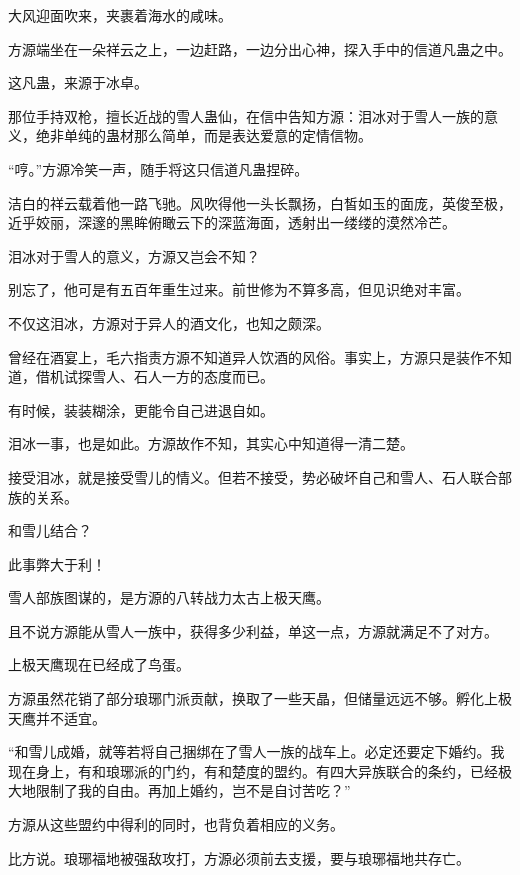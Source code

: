 
\begin{this_body}



大风迎面吹来，夹裹着海水的咸味。

方源端坐在一朵祥云之上，一边赶路，一边分出心神，探入手中的信道凡蛊之中。

这凡蛊，来源于冰卓。

那位手持双枪，擅长近战的雪人蛊仙，在信中告知方源：泪冰对于雪人一族的意义，绝非单纯的蛊材那么简单，而是表达爱意的定情信物。

“哼。”方源冷笑一声，随手将这只信道凡蛊捏碎。

洁白的祥云载着他一路飞驰。风吹得他一头长飘扬，白皙如玉的面庞，英俊至极，近乎姣丽，深邃的黑眸俯瞰云下的深蓝海面，透射出一缕缕的漠然冷芒。

泪冰对于雪人的意义，方源又岂会不知？

别忘了，他可是有五百年重生过来。前世修为不算多高，但见识绝对丰富。

不仅这泪冰，方源对于异人的酒文化，也知之颇深。

曾经在酒宴上，毛六指责方源不知道异人饮酒的风俗。事实上，方源只是装作不知道，借机试探雪人、石人一方的态度而已。

有时候，装装糊涂，更能令自己进退自如。

泪冰一事，也是如此。方源故作不知，其实心中知道得一清二楚。

接受泪冰，就是接受雪儿的情义。但若不接受，势必破坏自己和雪人、石人联合部族的关系。

和雪儿结合？

此事弊大于利！

雪人部族图谋的，是方源的八转战力太古上极天鹰。

且不说方源能从雪人一族中，获得多少利益，单这一点，方源就满足不了对方。

上极天鹰现在已经成了鸟蛋。

方源虽然花销了部分琅琊门派贡献，换取了一些天晶，但储量远远不够。孵化上极天鹰并不适宜。

“和雪儿成婚，就等若将自己捆绑在了雪人一族的战车上。必定还要定下婚约。我现在身上，有和琅琊派的门约，有和楚度的盟约。有四大异族联合的条约，已经极大地限制了我的自由。再加上婚约，岂不是自讨苦吃？”

方源从这些盟约中得利的同时，也背负着相应的义务。

比方说。琅琊福地被强敌攻打，方源必须前去支援，要与琅琊福地共存亡。


\end{this_body}
